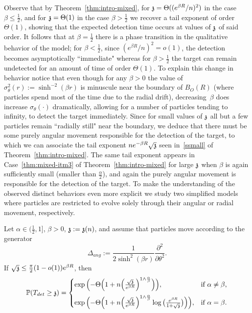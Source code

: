 %
Observe that by Theorem~\ref{thm:intro-mixed}, for $\ss=\Theta((e^{\beta R}/n)^{2})$  in the case $\beta\le \frac{1}{2}$, and for $\ss=\Theta(1)$ in the case $\beta>\frac{1}{2}$  we recover a tail exponent of order $\Theta(1)$, showing that the expected detection time occurs at values of $\ss$ of said order. It follows that at $\beta=\frac{1}{2}$ there is a phase transition in the qualitative behavior of the  model; for $\beta<\frac{1}{2}$, since $(e^{\beta R}/n)^2=o(1)$, the detection becomes asymptotically ``immediate" whereas for $\beta>\frac{1}{2}$ the target can remain undetected for an amount of time of order $\Theta(1)$. To explain this change in behavior notice that even though for any $\beta>0$ the value of $\sigma^{2}_{\theta}(r):=\sinh^{-2}(\beta r)$ is minuscule near the boundary of $B_O(R)$ (where particles spend most of the time due to the radial drift), decreasing~$\beta$ does increase $\sigma_{\theta}(\cdot)$ dramatically, allowing for a number of particles tending to infinity, to detect the target immediately. Since for small values of $\ss$ all but a few particles remain ``radially still" near the boundary, we deduce that there must be some purely angular movement responsible for the detection of the target, to which we can associate the tail exponent $ne^{-\beta R}\sqrt{\ss}$ seen in~\eqref{ssmall} of Theorem~\ref{thm:intro-mixed}. The same tail exponent appears in Case~\eqref{thm:mixed-itm3} of Theorem~\ref{thm:intro-mixed} for large $\ss$ when $\beta$ is again sufficiently small (smaller than $\frac{\alpha}{2}$), and again the purely angular movement is responsible for the detection of the target. %
To make the understanding of the observed distinct behaviors even more explicit we study two simplified models where particles are restricted to evolve solely through their angular or radial movement, respectively.
\begin{theorem}\label{thm:angularMain}
Let $\alpha\in (\frac12,1]$, $\beta>0$, $\ss:=\ss(n)$, and assume that particles move according to the generator
  \begin{equation*}\label{anggenerator}
	\Delta_{ang} := \frac{1}{2\sinh^2(\beta r)}\frac{\partial^2}{\partial\theta^2}.
	\end{equation*}
If $\sqrt{\ss}\leq\frac{\pi}{2}(1-o(1))e^{\beta R}$, then 
\[
\P(T_{det}\geq \ss) = 
\begin{cases}
\exp\Big({-}\Theta\Big(\mkor{\nu}{1}+n\Big(\frac{\sqrt{\ss}}{e^{\beta R}}\Big)^{1\wedge \frac{\alpha}{\beta}}\Big)\Big), & \text{if $\alpha\neq\beta$,} \\[8pt]
\exp\Big({-}\Theta\Big(\mkor{\nu}{1}+n\Big(\frac{\sqrt{\ss}}{e^{\beta R}}\Big)^{1\wedge \frac{\alpha}{\beta}}\log\big(\frac{e^{\beta R}}{1+\sqrt{\ss}}\big)\Big)\Big), & \text{if $\alpha=\beta$.}
\end{cases}
\]
\end{theorem}

